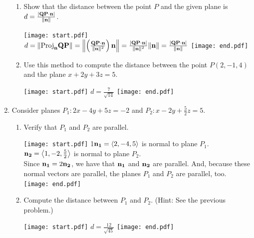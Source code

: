 \documentclass[12pt]{article}
\begin{document}
\begin{enumerate}
\begin{enumerate}

\item Show that the distance between the point $P$ and the given plane is $d=\frac{|{\bf QP}\cdot{\bf n}|}{\|{\bf n}\|}$.

\texttt{[image: start.pdf]}
{{$d=\left\|\text{Proj}_{\bf n}{\bf QP}\right\|=\left\|\left(\frac{{\bf QP}\cdot{\bf n}}{\|{\bf n}\|^2}\right){\bf n}\right\| =\frac{|{\bf QP}\cdot{\bf n}|}{\|{\bf n}\|^2}\|{\bf n}\|=\frac{|{\bf QP}\cdot {\bf n}|}{\|{\bf n}\|}$}}
\texttt{[image: end.pdf]}


\item Use this method to compute the distance between the point $P(2,-1,4)$ and the plane $x+2y+3z=5$.

\texttt{[image: start.pdf]}
{{$d=\frac{7}{\sqrt{14}}$}}
\texttt{[image: end.pdf]}


\end{enumerate}

\item Consider planes $P_1:2x-4y+5z=-2$ and $P_2:x-2y+\frac{5}{2}z=5$.

\begin{enumerate}

\item Verify that $P_1$ and $P_2$ are parallel.

\texttt{[image: start.pdf]}
{{{1\linewidth}{${\bf n_1}=\langle 2, -4, 5\rangle$ is normal to plane $P_1$.\\
${\bf n_2}=\left\langle 1, -2, \frac{5}{2}\right\rangle$ is normal to plane $P_2$.\\
Since ${\bf n_1}=2{\bf n_2}$, we have that ${\bf n_1}$ and ${\bf n_2}$ are parallel.  And, because these normal vectors are parallel, the planes $P_1$ and $P_2$ are parallel, too.}}}
\texttt{[image: end.pdf]}


\item Compute the distance between $P_1$ and $P_2$.  (Hint: See the previous problem.)

\texttt{[image: start.pdf]}
{{$d=\frac{12}{\sqrt{45}}$}}
\texttt{[image: end.pdf]}


\end{enumerate}

\end{enumerate}
\end{document}
